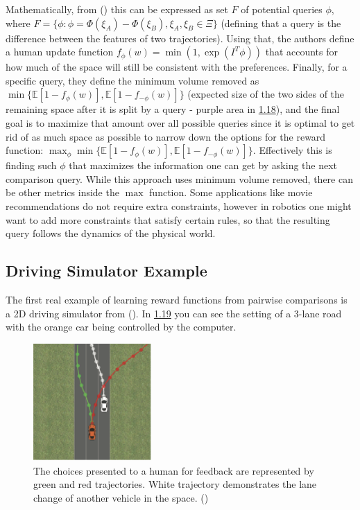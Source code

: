 \documentclass[
  letterpaper,
  DIV=11,
  numbers=noendperiod,
  oneside]{scrreprt}
\theoremstyle{remark}
\begin{document}
Mathematically, from () this can be expressed as set \(F\) of potential queries \(\phi\),
where
\(F = \{\phi: \phi = \Phi(\xi_A) - \Phi(\xi_B), \xi_A, \xi_B \in \Xi\}\)
(defining that a query is the difference between the features of two
trajectories). Using that, the authors define a human update function
\(f_{\phi}(w) = \min(1, \exp(I^T\phi))\) that accounts for how much of
the space will still be consistent with the preferences. Finally, for a
specific query, they define the minimum volume removed as
\(\min\{\mathbb{E}[1 - f_{\phi}(w)], \mathbb{E}[1 - f_{-\phi}(w)]\}\)
(expected size of the two sides of the remaining space after it is split
by a query - purple area in \hyperref[fig:2dspace]{1.18}), and the final
goal is to maximize that amount over all possible queries since it is
optimal to get rid of as much space as possible to narrow down the
options for the reward function:
\(\max_{\phi} \min\{ \mathbb{E}[1 - f_{\phi}(w)], \mathbb{E}[1 - f_{-\phi}(w)]\}\).
Effectively this is finding such \(\phi\) that maximizes the information
one can get by asking the next comparison query. While this approach
uses minimum volume removed, there can be other metrics inside the
\(\max\) function. Some applications like movie recommendations do not
require extra constraints, however in robotics one might want to add
more constraints that satisfy certain rules, so that the resulting query
follows the dynamics of the physical world.

\subsection{Driving Simulator Example}\label{driving-simulator-example}

The first real example of learning reward functions from pairwise
comparisons is a 2D driving simulator from
(). In
\hyperref[fig:car_direct]{1.19} you can see the setting of a 3-lane road
with the orange car being controlled by the computer.

\begin{figure}

{\centering \includegraphics[width=0.4\textwidth,height=\textheight]{Figures/car_dir.png}

}

\caption{The choices presented to a human for feedback are represented
by green and red trajectories. White trajectory demonstrates the lane
change of another vehicle in the space.
()}

\end{figure}%
\end{document}
